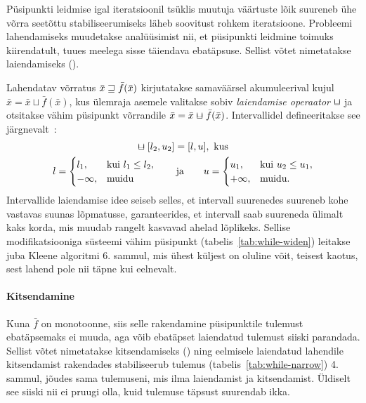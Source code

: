 \documentclass[../thesis.tex]{subfiles}
\begin{document}
Püsipunkti leidmise igal iteratsioonil tsüklis muutuja väärtuste lõik suureneb ühe võrra seetõttu stabiliseerumiseks läheb soovitust rohkem iteratsioone. Probleemi lahendamiseks muudetakse analüüsimist nii, et püsipunkti leidmine toimuks kiirendatult, tuues meelega sisse täiendava ebatäpsuse. Sellist võtet nimetatakse laiendamiseks ().

Lahendatav võrratus $\bar{x} \sqsupseteq \bar{f}(\bar{x})$ kirjutatakse samaväärsel akumuleerival kujul $\bar{x} = \bar{x} \sqcup \bar{f}(\bar{x})$, kus ülemraja asemele valitakse sobiv \emph{laiendamise operaator} $\widen$ ja otsitakse vähim püsipunkt võrrandile $\bar{x} = \bar{x} \widen \bar{f}(\bar{x})$. Intervallidel defineeritakse see järgnevalt~\cite[62]{seidl_foundations}:
\begin{gather*}
	[l_1, u_1] \widen [l_2, u_2] = [l, u], \text{ kus} \\
	l = \begin{cases}
		l_1, & \text{kui } l_1 \leq l_2, \\
		-\infty, & \text{muidu}
	\end{cases}
	\qquad \text{ja} \qquad
	u = \begin{cases}
		u_1, & \text{kui } u_2 \leq u_1, \\
		+\infty, & \text{muidu}.
	\end{cases}
\end{gather*}
Intervallide laiendamise idee seiseb selles, et intervall suurenedes suureneb kohe vastavas suunas lõpmatusse, garanteerides, et intervall saab suureneda ülimalt kaks korda, mis muudab rangelt kasvavad ahelad lõplikeks. Sellise modifikatsiooniga süsteemi vähim püsipunkt (tabelis~\ref{tab:while-widen}) leitakse juba Kleene algoritmi 6. sammul, mis ühest küljest on oluline võit, teisest kaotus, sest lahend pole nii täpne kui eelnevalt.

\paragraph{Kitsendamine}
Kuna $\bar{f}$ on monotoonne, siis selle rakendamine püsipunktile tulemust ebatäpsemaks ei muuda, aga võib ebatäpset laiendatud tulemust siiski parandada. Sellist võtet nimetatakse kitsendamiseks () ning eelmisele laiendatud lahendile kitsendamist rakendades stabiliseerub tulemus (tabelis~\ref{tab:while-narrow}) 4. sammul, jõudes sama tulemuseni, mis ilma laiendamist ja kitsendamist. Üldiselt see siiski nii ei pruugi olla, kuid tulemuse täpsust suurendab ikka.
\end{document}
